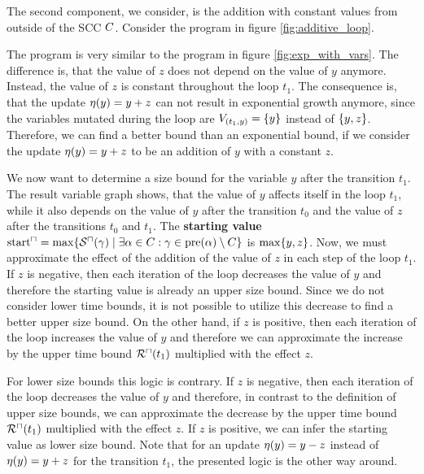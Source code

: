 The second component, we consider, is the addition with constant values from outside of the SCC $C$.
Consider the program in figure \ref{fig:additive_loop}.



The program is very similar to the program in figure \ref{fig:exp_with_vars}.
The difference is, that the value of $z$ does not depend on the value of $y$ anymore.
Instead, the value of $z$ is constant throughout the loop $t_1$.
The consequence is, that the update $\eta(y) = y + z$ can not result in exponential growth anymore, since the variables mutated during the loop are $V_{(t_1,y)} = \lbrace y \rbrace$ instead of $\lbrace y,z \rbrace$.
Therefore, we can find a better bound than an exponential bound, if we consider the update $\eta(y) = y + z$ to be an addition of $y$ with a constant $z$.

We now want to determine a size bound for the variable $y$ after the transition $t_1$.
The result variable graph shows, that the value of $y$ affects itself in the loop $t_1$, while it also depends on the value of $y$ after the transition $t_0$ and the value of $z$ after the transitions $t_0$ and $t_1$.
The \textbf{starting value} $\text{start}^\sqcap = \max \lbrace {\mathcal{S}^\sqcap}(\gamma) \mid \exists \alpha \in C: \gamma \in \text{pre}(\alpha) \setminus C \rbrace$ is $\max \lbrace y,z \rbrace$.
Now, we must approximate the effect of the addition of the value of $z$ in each step of the loop $t_1$.
If $z$ is negative, then each iteration of the loop decreases the value of $y$ and therefore the starting value is already an upper size bound.
Since we do not consider lower time bounds, it is not possible to utilize this decrease to find a better upper size bound.
On the other hand, if $z$ is positive, then each iteration of the loop increases the value of $y$ and therefore we can approximate the increase by the upper time bound ${\mathcal{R}^\sqcap}(t_1)$ multiplied with the effect $z$.

For lower size bounds this logic is contrary.
If $z$ is negative, then each iteration of the loop decreases the value of $y$ and therefore, in contrast to the definition of upper size bounds, we can approximate the decrease by the upper time bound ${\mathcal{R}^\sqcap}(t_1)$ multiplied with the effect $z$.
If $z$ is positive, we can infer the starting value as lower size bound.
Note that for an update $\eta(y) = y - z$ instead of $\eta(y) = y + z$ for the transition $t_1$, the presented logic is the other way around.

